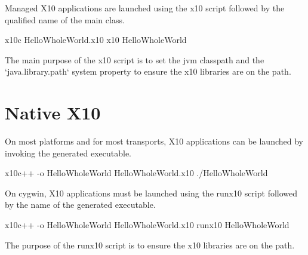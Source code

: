 Managed X10 applications are launched using the x10 script followed by the qualified name of the main class.

\begin{xten}
x10c HelloWholeWorld.x10
x10 HelloWholeWorld
\end{xten}

The main purpose of the x10 script is to set the jvm classpath and the
\xcd`java.library.path` system property to ensure the x10 libraries are on the
path.  


\section{Native X10}
\label{sect:RunningNative}

On most platforms and for most transports, X10 applications can be launched by invoking the generated executable.

\begin{xten}
x10c++ -o HelloWholeWorld HelloWholeWorld.x10
./HelloWholeWorld
\end{xten}

On cygwin, X10 applications must be launched using the runx10 script followed by the name of the generated executable.

\begin{xten}
x10c++ -o HelloWholeWorld HelloWholeWorld.x10
runx10 HelloWholeWorld
\end{xten}
The purpose of the runx10 script is to ensure the x10 libraries are on the path. 
